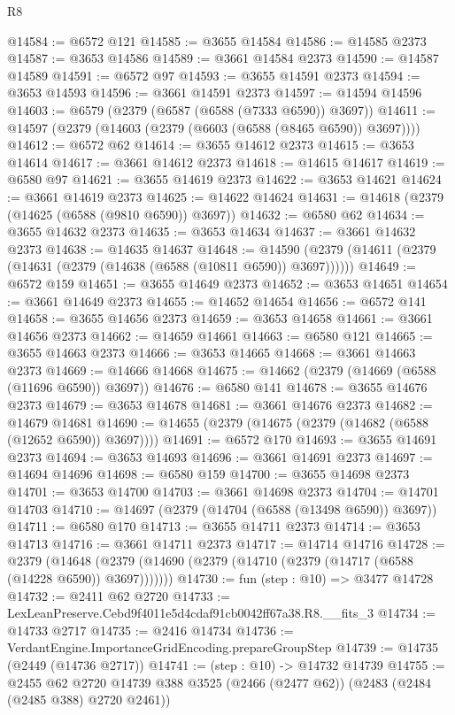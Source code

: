 \begin{lexlean}{R8}
\begin{coremodule}
@14584 := @6572 @121
@14585 := @3655 @14584
@14586 := @14585 @2373
@14587 := @3653 @14586
@14589 := @3661 @14584 @2373
@14590 := @14587 @14589
@14591 := @6572 @97
@14593 := @3655 @14591 @2373
@14594 := @3653 @14593
@14596 := @3661 @14591 @2373
@14597 := @14594 @14596
@14603 := @6579 (@2379 (@6587 (@6588 (@7333 @6590)) @3697))
@14611 := @14597 (@2379 (@14603 (@2379 (@6603 (@6588 (@8465 @6590)) @3697))))
@14612 := @6572 @62
@14614 := @3655 @14612 @2373
@14615 := @3653 @14614
@14617 := @3661 @14612 @2373
@14618 := @14615 @14617
@14619 := @6580 @97
@14621 := @3655 @14619 @2373
@14622 := @3653 @14621
@14624 := @3661 @14619 @2373
@14625 := @14622 @14624
@14631 := @14618 (@2379 (@14625 (@6588 (@9810 @6590)) @3697))
@14632 := @6580 @62
@14634 := @3655 @14632 @2373
@14635 := @3653 @14634
@14637 := @3661 @14632 @2373
@14638 := @14635 @14637
@14648 := @14590 (@2379 (@14611 (@2379 (@14631 (@2379 (@14638 (@6588 (@10811 @6590)) @3697))))))
@14649 := @6572 @159
@14651 := @3655 @14649 @2373
@14652 := @3653 @14651
@14654 := @3661 @14649 @2373
@14655 := @14652 @14654
@14656 := @6572 @141
@14658 := @3655 @14656 @2373
@14659 := @3653 @14658
@14661 := @3661 @14656 @2373
@14662 := @14659 @14661
@14663 := @6580 @121
@14665 := @3655 @14663 @2373
@14666 := @3653 @14665
@14668 := @3661 @14663 @2373
@14669 := @14666 @14668
@14675 := @14662 (@2379 (@14669 (@6588 (@11696 @6590)) @3697))
@14676 := @6580 @141
@14678 := @3655 @14676 @2373
@14679 := @3653 @14678
@14681 := @3661 @14676 @2373
@14682 := @14679 @14681
@14690 := @14655 (@2379 (@14675 (@2379 (@14682 (@6588 (@12652 @6590)) @3697))))
@14691 := @6572 @170
@14693 := @3655 @14691 @2373
@14694 := @3653 @14693
@14696 := @3661 @14691 @2373
@14697 := @14694 @14696
@14698 := @6580 @159
@14700 := @3655 @14698 @2373
@14701 := @3653 @14700
@14703 := @3661 @14698 @2373
@14704 := @14701 @14703
@14710 := @14697 (@2379 (@14704 (@6588 (@13498 @6590)) @3697))
@14711 := @6580 @170
@14713 := @3655 @14711 @2373
@14714 := @3653 @14713
@14716 := @3661 @14711 @2373
@14717 := @14714 @14716
@14728 := @2379
    (@14648 (@2379 (@14690 (@2379 (@14710 (@2379 (@14717 (@6588 (@14228 @6590)) @3697)))))))
@14730 := fun (step : @10) => @3477 @14728
@14732 := @2411 @62 @2720
@14733 := LexLeanPreserve.Cebd9f4011e5d4cdaf91cb0042ff67a38.R8.__fits_3
@14734 := @14733 @2717
@14735 := @2416 @14734
@14736 := VerdantEngine.ImportanceGridEncoding.prepareGroupStep
@14739 := @14735 (@2449 (@14736 @2717))
@14741 := (step : @10) -> @14732 @14739
@14755 := @2455
    @62
    @2720
    @14739
    @388
    @3525
    (@2466 (@2477 @62))
    (@2483 (@2484 (@2485 @388) @2720 @2461))

\end{coremodule}
\end{lexlean}
